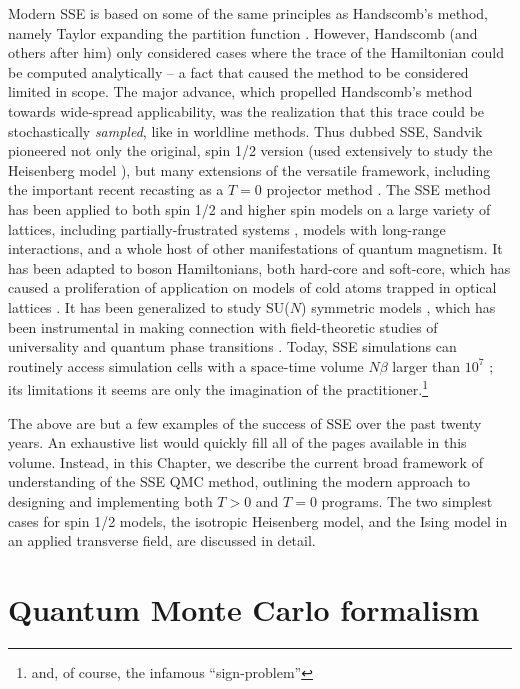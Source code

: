 \documentclass[vecphys]{svmult}
\begin{document}
Modern SSE is based on some of the same principles as Handscomb's method, namely Taylor expanding the partition function \cite{Melko:Handscomb62}.  However, Handscomb (and others after him) only considered cases where the trace of the Hamiltonian could be computed analytically --  a fact that caused the method to be considered limited in scope.
The major advance, which propelled Handscomb's method towards wide-spread applicability, was the realization that this trace could be stochastically {\em sampled}, like in worldline methods.
Thus dubbed SSE, Sandvik \cite{Melko:Sandvik91,Melko:Sandvik92} pioneered not only the original, spin 1/2 version (used extensively to study the Heisenberg model \cite{Melko:SandvikHeis}), but many extensions of the versatile framework, including the important recent recasting as a $T=0$ projector method \cite{Melko:Sandvik05,Melko:Beach06}.  The SSE method has been applied to both spin 1/2 and higher spin models \cite{Melko:Sandvik91,Melko:Henel} on a large variety of lattices, including partially-frustrated systems \cite{Melko:Melko07}, models with long-range interactions\cite{Melko:Sandvik03}, and a whole host of other manifestations of quantum magnetism.  It has been adapted to boson Hamiltonians, both hard-core and soft-core, which has caused a proliferation of application on models of cold atoms trapped in optical lattices \cite{Melko:Wessel04,Melko:CA3,Melko:CA2}.  It has been generalized to study SU($N$) symmetric models \cite{Melko:harada2003:sun,Melko:Kawashima07}, which has been instrumental in making connection with field-theoretic studies of universality and quantum phase transitions \cite{Melko:kaul2011:j1j2,Melko:Designer}.  Today, SSE simulations can routinely access simulation cells with a space-time volume $N\beta$ larger than $10^7$ \cite{Melko:Sandvik10c};  its limitations it seems are only the imagination of the practitioner.\footnote{and, of course, the infamous ``sign-problem''}

The above are but a few examples of the success of SSE over the past twenty years.  An exhaustive list would quickly fill all of the pages available in this volume.  Instead, in this Chapter, we describe the current broad framework of understanding of the SSE QMC method, outlining the modern approach to designing and implementing both $T>0$ and $T=0$ programs.  The two simplest cases for spin 1/2 models, the isotropic Heisenberg model, and the Ising model in an applied transverse field, are discussed in detail.  

\section{Quantum Monte Carlo formalism}
\end{document}
